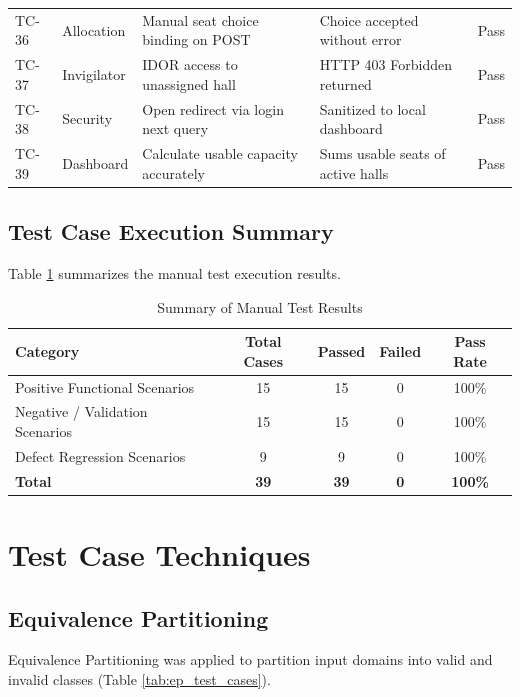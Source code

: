 \documentclass{InternshipReport}
\begin{document}
\begin{longtable}{p{} p{} p{} p{} p{}}
TC-36 & Allocation & Manual seat choice binding on POST & Choice accepted without error & Pass \\
TC-37 & Invigilator & IDOR access to unassigned hall & HTTP 403 Forbidden returned & Pass \\
TC-38 & Security & Open redirect via login next query & Sanitized to local dashboard & Pass \\
TC-39 & Dashboard & Calculate usable capacity accurately & Sums usable seats of active halls & Pass \\
\bottomrule
\end{longtable}

\subsection{Test Case Execution Summary}
Table \ref{tab:manual_summary} summarizes the manual test execution results.

\begin{table}[H]
\centering
\caption{Summary of Manual Test Results}
\label{tab:manual_summary}
\begin{tabular}{l c c c c}
\toprule
\textbf{Category} & \textbf{Total Cases} & \textbf{Passed} & \textbf{Failed} & \textbf{Pass Rate} \\
\midrule
Positive Functional Scenarios & 15 & 15 & 0 & 100\% \\
Negative / Validation Scenarios & 15 & 15 & 0 & 100\% \\
Defect Regression Scenarios & 9 & 9 & 0 & 100\% \\
\midrule
\textbf{Total} & \textbf{39} & \textbf{39} & \textbf{0} & \textbf{100\%} \\
\bottomrule
\end{tabular}
\end{table}

\section{Test Case Techniques}

\subsection{Equivalence Partitioning}
Equivalence Partitioning was applied to partition input domains into valid and invalid classes (Table \ref{tab:ep_test_cases}).
\end{document}
